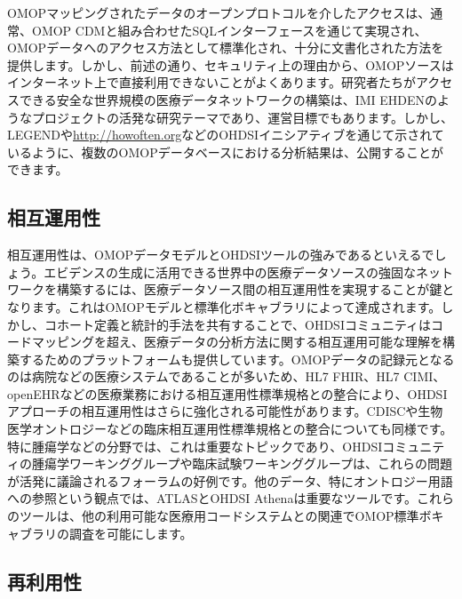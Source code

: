 \documentclass[
  11pt]{book}
\theoremstyle{definition}
\theoremstyle{definition}
\theoremstyle{definition}
\theoremstyle{definition}
\theoremstyle{remark}
\begin{document}
OMOPマッピングされたデータのオープンプロトコルを介したアクセスは、通常、OMOP CDMと組み合わせたSQLインターフェースを通じて実現され、OMOPデータへのアクセス方法として標準化され、十分に文書化された方法を提供します。しかし、前述の通り、セキュリティ上の理由から、OMOPソースはインターネット上で直接利用できないことがよくあります。研究者たちがアクセスできる安全な世界規模の医療データネットワークの構築は、IMI EHDENのようなプロジェクトの活発な研究テーマであり、運営目標でもあります。しかし、LEGENDや\href{http://howoften.org/}{http://howoften.org}などのOHDSIイニシアティブを通じて示されているように、複数のOMOPデータベースにおける分析結果は、公開することができます。

\subsection{相互運用性}\label{ux76f8ux4e92ux904bux7528ux6027}

相互運用性は、OMOPデータモデルとOHDSIツールの強みであるといえるでしょう。エビデンスの生成に活用できる世界中の医療データソースの強固なネットワークを構築するには、医療データソース間の相互運用性を実現することが鍵となります。これはOMOPモデルと標準化ボキャブラリによって達成されます。しかし、コホート定義と統計的手法を共有することで、OHDSIコミュニティはコードマッピングを超え、医療データの分析方法に関する相互運用可能な理解を構築するためのプラットフォームも提供しています。OMOPデータの記録元となるのは病院などの医療システムであることが多いため、HL7 FHIR、HL7 CIMI、openEHRなどの医療業務における相互運用性標準規格との整合により、OHDSIアプローチの相互運用性はさらに強化される可能性があります。CDISCや生物医学オントロジーなどの臨床相互運用性標準規格との整合についても同様です。特に腫瘍学などの分野では、これは重要なトピックであり、OHDSIコミュニティの腫瘍学ワーキンググループや臨床試験ワーキンググループは、これらの問題が活発に議論されるフォーラムの好例です。他のデータ、特にオントロジー用語への参照という観点では、ATLASとOHDSI Athenaは重要なツールです。これらのツールは、他の利用可能な医療用コードシステムとの関連でOMOP標準ボキャブラリの調査を可能にします。

\subsection{再利用性}\label{ux518dux5229ux7528ux6027}
\end{document}
